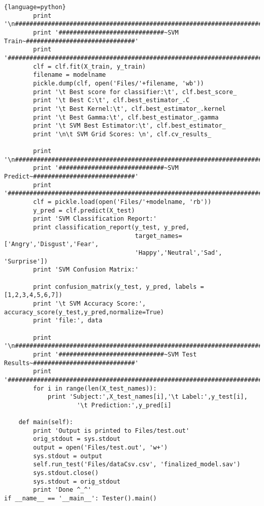 \begin{lstlisting}{language=python}
        print '\n######################################################################'
        print '#############################~SVM Train~##############################'
        print '######################################################################'
        clf = clf.fit(X_train, y_train)
        filename = modelname
        pickle.dump(clf, open('Files/'+filename, 'wb'))
        print '\t Best score for classifier:\t', clf.best_score_
        print '\t Best C:\t', clf.best_estimator_.C
        print '\t Best Kernel:\t', clf.best_estimator_.kernel
        print '\t Best Gamma:\t', clf.best_estimator_.gamma
        print '\t SVM Best Estimator:\t', clf.best_estimator_
        print '\n\t SVM Grid Scores: \n', clf.cv_results_

        print '\n######################################################################'
        print '#############################~SVM Predict~############################'
        print '######################################################################'
        clf = pickle.load(open('Files/'+modelname, 'rb'))
        y_pred = clf.predict(X_test)
        print 'SVM Classification Report:'
        print classification_report(y_test, y_pred,
                                    target_names=['Angry','Disgust','Fear',
                                    'Happy','Neutral','Sad', 'Surprise'])
        print 'SVM Confusion Matrix:'

        print confusion_matrix(y_test, y_pred, labels = [1,2,3,4,5,6,7])
        print '\t SVM Accuracy Score:', accuracy_score(y_test,y_pred,normalize=True)
        print 'file:', data

        print '\n######################################################################'
        print '#############################~SVM Test Results~############################'
        print '######################################################################'
        for i in range(len(X_test_names)):
            print 'Subject:',X_test_names[i],'\t Label:',y_test[i],
            		'\t Prediction:',y_pred[i]

    def main(self):
        print 'Output is printed to Files/test.out'
        orig_stdout = sys.stdout
        output = open('Files/test.out', 'w+')
        sys.stdout = output
        self.run_test('Files/dataCsv.csv', 'finalized_model.sav')
        sys.stdout.close()
        sys.stdout = orig_stdout
        print 'Done ^_^'
if __name__ == '__main__': Tester().main()
\end{lstlisting}%
